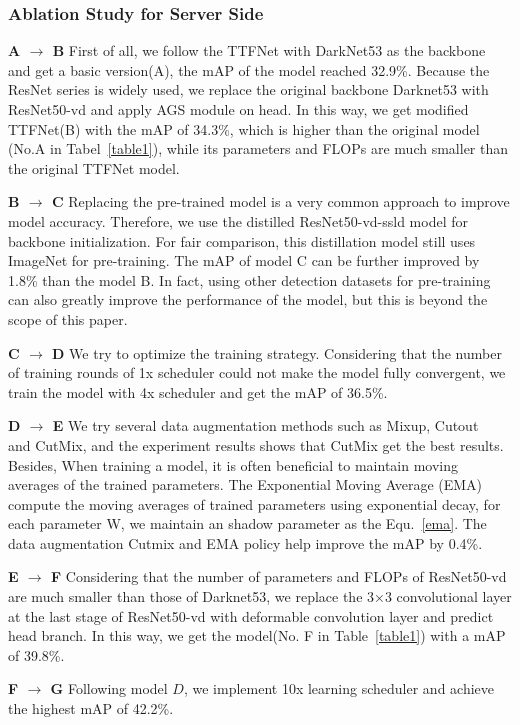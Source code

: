 \documentclass[10pt,twocolumn,letterpaper]{article}
\begin{document}
    
    \subsubsection{Ablation Study for Server Side}
{\bf{A $\rightarrow$ B}} First of all, we follow the TTFNet with DarkNet53 as the backbone and get a basic version(A), the mAP of the model reached 32.9\%. Because the ResNet series is  widely used, we replace the original backbone Darknet53 with ResNet50-vd and apply AGS module on head. In this way, we get modified TTFNet(B) with the mAP of 34.3\%, which is higher than the original model (No.A in Tabel~\ref{table1}), while its parameters and FLOPs are much smaller than the original TTFNet model.
    
{\bf{B $\rightarrow$ C}} Replacing the pre-trained model is a very common approach to improve model accuracy. Therefore, we use the distilled ResNet50-vd-ssld model for backbone initialization. For fair comparison, this distillation model still uses ImageNet for pre-training. The mAP of model C can be further improved by 1.8\% than the model B. In fact, using other detection datasets for pre-training can also greatly improve the performance of the model, but this is beyond the scope of this paper.
    
{\bf{C $\rightarrow$ D}} We try to optimize the training strategy. Considering that the number of training rounds of 1x scheduler could not make the model fully convergent, we train the model with 4x scheduler and get the mAP of 36.5\%.
    
{\bf{D $\rightarrow$ E}} We try several data augmentation methods such as Mixup, Cutout~\cite{devries2017improved} and CutMix, and the experiment results shows that CutMix get the best results. Besides, When training a model, it is often beneficial to maintain moving averages of the trained parameters. The Exponential Moving Average (EMA) compute the moving averages of trained parameters using exponential decay, for each parameter W, we maintain an shadow parameter as the Equ.~\ref{ema}. The data augmentation Cutmix and EMA policy help improve the mAP by 0.4\%.

{\bf{E $\rightarrow$ F}} Considering that the number of parameters and FLOPs of ResNet50-vd are much smaller than those of Darknet53, we replace the 3×3 convolutional layer at the last stage of ResNet50-vd with deformable convolution layer and predict head branch. In this way, we get the model(No. F in Table~\ref{table1}) with a mAP of 39.8\%. 
    
{\bf{F $\rightarrow$ G}} Following model $D$, we implement 10x learning scheduler and achieve the highest mAP of 42.2\%.
    
\end{document}
